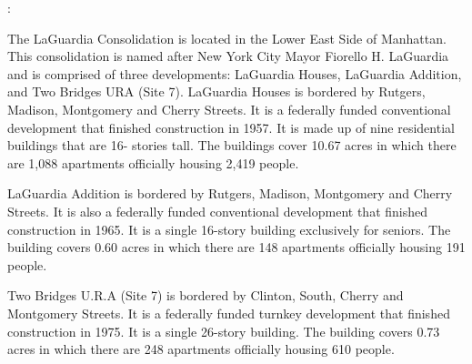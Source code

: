 :   

 

The LaGuardia Consolidation is located in the Lower East Side of Manhattan. This consolidation is named after New York City Mayor Fiorello H. LaGuardia and is comprised of three developments: LaGuardia Houses, LaGuardia Addition, and Two Bridges URA (Site 7). LaGuardia Houses is bordered by Rutgers, Madison, Montgomery and Cherry Streets. It is a federally funded conventional development that finished construction in 1957. It is made up of nine residential buildings that are 16- stories tall. The buildings cover 10.67 acres in which there are 1,088 apartments officially housing 2,419 people.    

   

LaGuardia Addition is bordered by Rutgers, Madison, Montgomery and Cherry Streets. It is also a federally funded conventional development that finished construction in 1965. It is a single 16-story building exclusively for seniors. The building covers 0.60 acres in which there are 148 apartments officially housing 191 people.    

Two Bridges U.R.A (Site 7) is bordered by Clinton, South, Cherry and Montgomery Streets. It is a federally funded turnkey development that finished construction in 1975. It is a single 26-story building. The building covers 0.73 acres in which there are 248 apartments officially housing 610 people.    